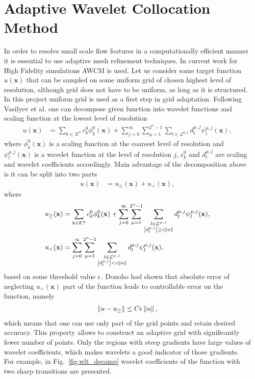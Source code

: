 \section{Adaptive Wavelet Collocation Method}
In order to resolve small scale flow features in a computationally efficient manner it is essential to use adaptive mesh refinement techniques. In current work for High Fidelity simulations AWCM is used. Let us consider some target function $u(\mathbf x)$ that can be sampled on some uniform grid of chosen highest level of resolution, although grid does not have to be uniform, as long as it is structured. In this project uniform grid is used as a first step in grid adaptation. Following Vasilyev et al. \cite{lib:wlt_main} one can decompose given function into wavelet functions and scaling function at the lowest level of resolution
\begin{align}
u(\mathbf x) &= \sum_{k \in \mathcal K^0} c_k^0 \phi_k^0 (\mathbf x) + \sum_{j = 0}^\infty \sum_{\mu = 1}^{2^n - 1} \sum_{l \in \mathcal L^{\mu, j}} d_l^{\mu, j} \psi_l^{\mu, j} (\mathbf x),
\end{align}
where $\phi_k^0(\mathbf x)$ is a scaling function at the coarsest level of resolution and $\psi_l^{\mu, j}(\mathbf x)$ is a wavelet function at the level of resolution $j$, $c_k^0$ and $d_l^{\mu, j}$ are scaling and wavelet coefficients accordingly. Main advantage of the decomposition above is it can be split into two parts
\begin{align}
u(\mathbf x) &= u_\ge (\mathbf x) + u_< (\mathbf x),
\end{align}
where
\begin{align}
\nonumber
u_\ge (\mathbf x) &= \sum_{k \in \mathcal K^0} c_k^0 \phi_k^0 (\mathbf x) + \sum_{j = 0}^\infty \sum_{\mu = 1}^{2^n - 1} \sum_{\substack{l \in \mathcal L^{\mu, j} \\ \left|d_l^{\mu, j}\right| \ge \epsilon \left\|u\right\| }} d_l^{\mu, j} \psi_l^{\mu, j} (\mathbf x), \\
u_<(\mathbf x) &= \sum_{j = 0}^\infty \sum_{\mu = 1}^{2^n - 1} \sum_{\substack{l \in \mathcal L^{\mu, j} \\ \left|d_l^{\mu, j}\right| < \epsilon \left\|u\right\| }} d_l^{\mu, j} \psi_l^{\mu, j} (\mathbf x),
\end{align}
based on some threshold value $\epsilon$. Donoho \cite{lib:donoho} had shown that absolute error of neglecting $u_<(\mathbf x)$ part of the function leads to controllable error on the function, namely
\begin{align}
\left\|u - u_\ge\right\| \le C \epsilon \left\|u\right\|,
\end{align}
which means that one can use only part of the grid points and retain desired accuracy. This property allows to construct an adaptive grid with significantly fewer number of points. Only the regions with steep gradients have large values of wavelet coefficients, which makes wavelets a good indicator of those gradients. For example, in Fig.~\ref{fig:wlt_decomp} wavelet coefficients of the function with two sharp transitions are presented.


